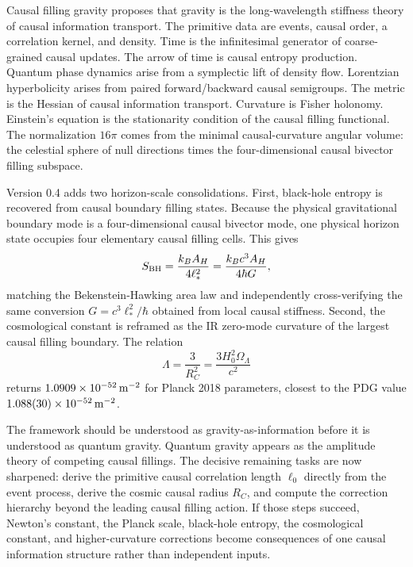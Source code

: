 \documentclass[11pt]{article}
\begin{document}
Causal filling gravity proposes that gravity is the long-wavelength stiffness theory of causal information transport. The primitive data are events, causal order, a correlation kernel, and density. Time is the infinitesimal generator of coarse-grained causal updates. The arrow of time is causal entropy production. Quantum phase dynamics arise from a symplectic lift of density flow. Lorentzian hyperbolicity arises from paired forward/backward causal semigroups. The metric is the Hessian of causal information transport. Curvature is Fisher holonomy. Einstein's equation is the stationarity condition of the causal filling functional. The normalization $16\pi$ comes from the minimal causal-curvature angular volume: the celestial sphere of null directions times the four-dimensional causal bivector filling subspace.

Version 0.4 adds two horizon-scale consolidations. First, black-hole entropy is recovered from causal boundary filling states. Because the physical gravitational boundary mode is a four-dimensional causal bivector mode, one physical horizon state occupies four elementary causal filling cells. This gives
\begin{equation}
S_{\rm BH}=\frac{k_BA_H}{4\ell_*^2}=\frac{k_Bc^3A_H}{4\hbar G},
\end{equation}
matching the Bekenstein-Hawking area law and independently cross-verifying the same conversion $G=c^3\ell_*^2/\hbar$ obtained from local causal stiffness. Second, the cosmological constant is reframed as the IR zero-mode curvature of the largest causal filling boundary. The relation
\begin{equation}
\Lambda=\frac{3}{R_C^2}=\frac{3H_0^2\Omega_\Lambda}{c^2}
\end{equation}
returns $1.0909\times10^{-52}\,{\rm m^{-2}}$ for Planck 2018 parameters, closest to the PDG value $1.088(30)\times10^{-52}\,{\rm m^{-2}}$.

The framework should be understood as gravity-as-information before it is understood as quantum gravity. Quantum gravity appears as the amplitude theory of competing causal fillings. The decisive remaining tasks are now sharpened: derive the primitive causal correlation length $\ell_0$ directly from the event process, derive the cosmic causal radius $R_C$, and compute the correction hierarchy beyond the leading causal filling action. If those steps succeed, Newton's constant, the Planck scale, black-hole entropy, the cosmological constant, and higher-curvature corrections become consequences of one causal information structure rather than independent inputs.
\end{document}
